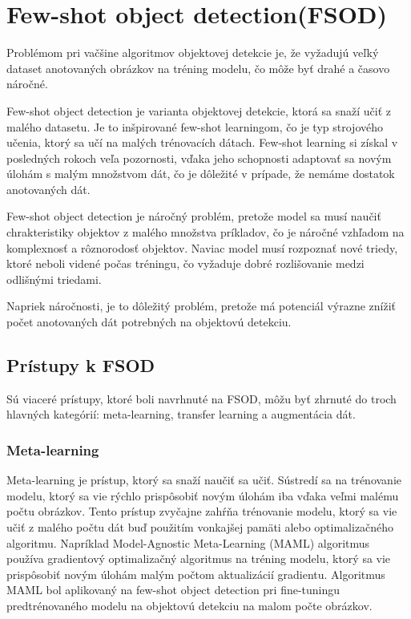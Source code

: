 \section{Few-shot object detection(FSOD)}
Problémom pri vačšine algoritmov objektovej detekcie je, že vyžadujú veľký dataset anotovaných obrázkov na tréning modelu, čo môže byť drahé a časovo náročné. 

Few-shot object detection je varianta objektovej detekcie, ktorá sa snaží učiť z malého datasetu. Je to inšpirované few-shot learningom, čo je typ strojového učenia, ktorý sa učí na malých trénovacích dátach. Few-shot learning si získal v posledných rokoch veľa pozornosti, vďaka jeho schopnosti adaptovať sa novým úlohám s malým množstvom dát, čo je dôležité v prípade, že nemáme dostatok anotovaných dát. 

Few-shot object detection je náročný problém, pretože model sa musí naučiť chrakteristiky objektov z malého množstva príkladov, čo je náročné vzhľadom na komplexnosť a rôznorodosť objektov. Naviac model musí rozpoznať nové triedy, ktoré neboli videné počas tréningu, čo vyžaduje dobré rozlišovanie medzi odlišnými triedami. 

Napriek náročnosti, je to dôležitý problém, pretože má potenciál výrazne znížiť počet anotovaných dát potrebných na objektovú detekciu. 

\subsection{Prístupy k FSOD}
Sú viaceré prístupy, ktoré boli navrhnuté na FSOD, môžu byť zhrnuté do troch hlavných kategórií: meta-learning, transfer learning a augmentácia dát.

\subsubsection{Meta-learning}
Meta-learning je prístup, ktorý sa snaží naučiť sa učiť. Sústredí sa na trénovanie modelu, ktorý sa vie rýchlo prispôsobiť novým úlohám iba vďaka veľmi malému počtu obrázkov. Tento prístup zvyčajne zahŕňa trénovanie modelu, ktorý sa vie učiť z malého počtu dát buď použitím vonkajšej pamäti alebo optimalizačného algoritmu. Napríklad Model-Agnostic Meta-Learning (MAML) \cite{finn2017model} algoritmus používa gradientový optimalizačný algoritmus na tréning modelu, ktorý sa vie prispôsobiť novým úlohám malým počtom aktualizácií gradientu. Algoritmus MAML bol aplikovaný na few-shot object detection pri fine-tuningu predtrénovaného modelu na objektovú detekciu na malom počte obrázkov.

